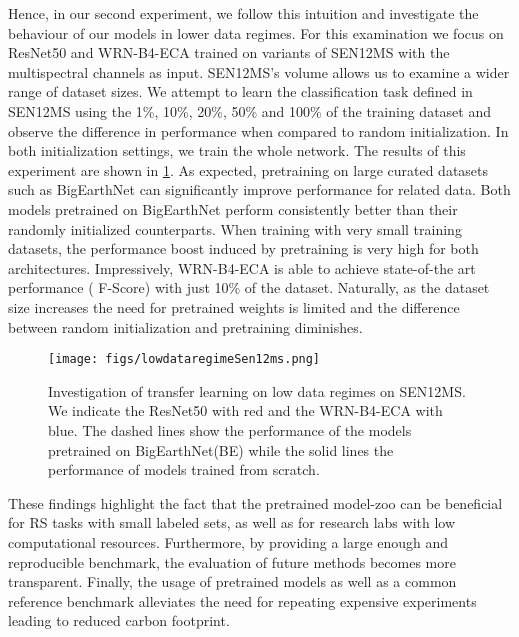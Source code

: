 \documentclass[journal]{IEEEtran}
\begin{document}
Hence, in our second experiment, we follow this intuition and investigate the behaviour of our models in lower data regimes. For this examination we focus on ResNet50 and WRN-B4-ECA trained on variants of SEN12MS with the multispectral channels as input. SEN12MS's volume allows us to examine a wider range of dataset sizes. We attempt to learn the classification task defined in SEN12MS using the 1\%, 10\%, 20\%, 50\% and 100\% of the training dataset and observe the difference in performance when compared to random initialization. In both initialization settings, we train the whole network. The results of this experiment are shown in \ref{fig:lowdataregime}. As expected, pretraining on large curated datasets such as BigEarthNet can significantly improve performance for related data. Both models pretrained on BigEarthNet perform consistently better than their randomly initialized counterparts. When training with very small training datasets, the performance boost induced by pretraining is very high for both architectures. Impressively, WRN-B4-ECA is able to achieve state-of-the art performance ( F-Score) with just 10\% of the dataset. Naturally, as the dataset size increases the need for pretrained weights is limited and the difference between random initialization and pretraining diminishes.

\begin{figure}[!htp]
\centering
 \texttt{[image: figs/lowdataregimeSen12ms.png]}
\caption{ Investigation of transfer learning on low data regimes on SEN12MS. We indicate the ResNet50 with red and the WRN-B4-ECA with blue. The dashed lines show the performance of the models pretrained on BigEarthNet(BE) while the solid lines the performance of models trained from scratch.}
\label{fig:lowdataregime}
\end{figure}

These findings highlight the fact that the pretrained model-zoo can be beneficial for RS tasks with small labeled sets, as well as for research labs with low computational resources.
Furthermore, by providing a large enough and reproducible benchmark, the evaluation of future methods becomes more transparent. Finally, the usage of pretrained models as well as a common reference benchmark alleviates the need for repeating expensive experiments leading to reduced carbon footprint. 
\end{document}
